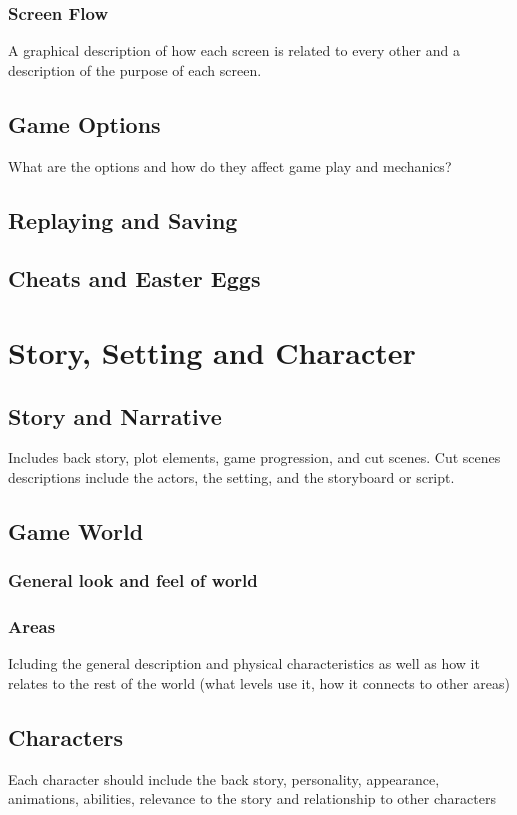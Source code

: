 \documentclass[12pt, letterpaper]{article}
\begin{document}
        \subsubsection{Screen Flow}
        A graphical description of how each screen is related to every other and a description of the purpose of each screen.
    \subsection{Game Options}
    What are the options and how do they affect game play and mechanics?
    \subsection{Replaying and Saving }
    \subsection{Cheats and Easter Eggs}
\section{Story, Setting and Character}
    \subsection{Story and Narrative}
    Includes back story, plot elements, game progression, and cut scenes.  Cut scenes descriptions include the actors, the setting, and the storyboard or script.
    \subsection{Game World}
        \subsubsection{General look and feel of world}
        \subsubsection{Areas}
        Icluding the general description and physical characteristics as well as how it relates to the rest of the world (what levels use it, how it connects to other areas)
    \subsection{Characters}
    Each character should include the back story, personality, appearance, animations, abilities, relevance to the story and relationship to other characters
\end{document}
